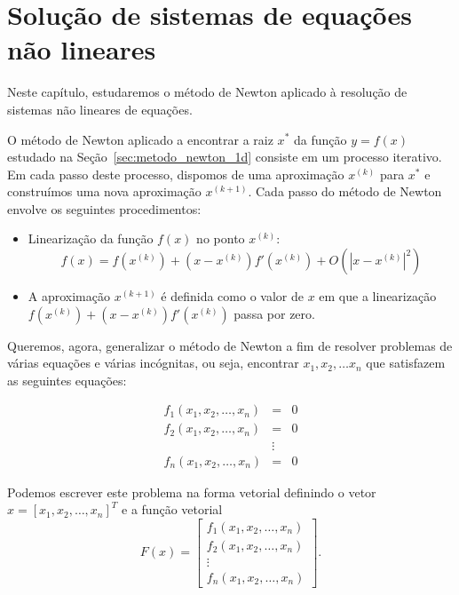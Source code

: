 
%

\chapter{Solução de sistemas de equações não lineares}
Neste capítulo, estudaremos o método de Newton aplicado à resolução de sistemas não lineares de equações.

O método de Newton aplicado a encontrar a raiz $x^*$ da função $y=f(x)$ estudado na Seção~\ref{sec:metodo_newton_1d} consiste em um processo iterativo. Em cada passo deste processo, dispomos de uma aproximação $x^{(k)}$ para $x^*$ e construímos uma nova aproximação $x^{(k+1)}$.  Cada passo do método de Newton envolve os seguintes procedimentos:
\begin{itemize}
\item Linearização da função $f(x)$ no ponto $x^{(k)}$:
  \begin{equation}
    f(x)= f(x^{(k)})+ (x-x^{(k)}) f'(x^{(k)}) + O\left(|x-x^{(k)}|^2\right)
  \end{equation}
\item A aproximação $x^{(k+1)}$ é definida como o valor de $x$ em que a linearização $f(x^{(k)})+ (x-x^{(k)}) f'(x^{(k)})$ passa por zero.
\end{itemize}


Queremos, agora, generalizar o método de Newton a fim de resolver problemas de várias equações e várias incógnitas, ou seja, encontrar $x_1,x_2,\ldots x_n$ que satisfazem as seguintes equações:

\begin{eqnarray}
f_1(x_1,x_2,\ldots,x_n)&=&0\\
f_2(x_1,x_2,\ldots,x_n)&=&0\\
&\vdots&\\
f_n(x_1,x_2,\ldots,x_n)&=&0
\end{eqnarray}

Podemos escrever este problema na forma vetorial definindo o vetor $x=[x_1,x_2,\ldots,x_n]^T$ e a função vetorial
\begin{equation}F(x)=\left[
\begin{array}{c}
f_1(x_1,x_2,\ldots,x_n)\\
f_2(x_1,x_2,\ldots,x_n)\\
\vdots\\
f_n(x_1,x_2,\ldots,x_n)
\end{array}
\right].\end{equation}

